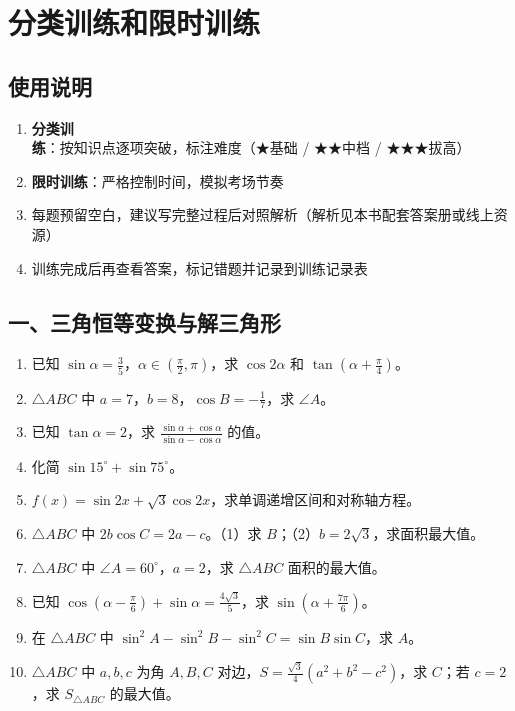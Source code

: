 \section{分类训练和限时训练}

\subsection{使用说明}

\begin{enumerate}
  \item \textbf{分类训练}：按知识点逐项突破，标注难度（★基础 / ★★中档 / ★★★拔高）
  \item \textbf{限时训练}：严格控制时间，模拟考场节奏
  \item 每题预留空白，建议写完整过程后对照解析（解析见本书配套答案册或线上资源）
  \item 训练完成后再查看答案，标记错题并记录到训练记录表
\end{enumerate}

\subsection{一、三角恒等变换与解三角形}

\begin{enumerate}
  \item[★] 已知 $\sin\alpha = \frac35$，$\alpha\in(\frac{\pi}{2},\pi)$，求 $\cos2\alpha$ 和 $\tan(\alpha+\frac{\pi}{4})$。
  \vspace{1.5cm}
  \item[★] $\triangle ABC$ 中 $a=7$，$b=8$，$\cos B=-\frac17$，求 $\angle A$。
  \vspace{1.5cm}
  \item[★] 已知 $\tan\alpha = 2$，求 $\frac{\sin\alpha+\cos\alpha}{\sin\alpha-\cos\alpha}$ 的值。
  \vspace{1.5cm}
  \item[★] 化简 $\sin15^\circ + \sin75^\circ$。
  \vspace{1cm}
  \item[★★] $f(x)=\sin2x+\sqrt3\cos2x$，求单调递增区间和对称轴方程。
  \vspace{2cm}
  \item[★★] $\triangle ABC$ 中 $2b\cos C = 2a-c$。（1）求 $B$；（2）$b=2\sqrt3$，求面积最大值。
  \vspace{3cm}
  \item[★★] $\triangle ABC$ 中 $\angle A=60^\circ$，$a=2$，求 $\triangle ABC$ 面积的最大值。
  \vspace{2.5cm}
  \item[★★] 已知 $\cos(\alpha-\frac{\pi}{6})+\sin\alpha = \frac{4\sqrt3}{5}$，求 $\sin(\alpha+\frac{7\pi}{6})$。
  \vspace{2cm}
  \item[★★] 在 $\triangle ABC$ 中 $\sin^2A-\sin^2B-\sin^2C = \sin B\sin C$，求 $A$。
  \vspace{2cm}
  \item[★★★] $\triangle ABC$ 中 $a,b,c$ 为角 $A,B,C$ 对边，$S=\frac{\sqrt3}{4}(a^2+b^2-c^2)$，求 $C$；若 $c=2$，求 $S_{\triangle ABC}$ 的最大值。
  \vspace{3cm}
\end{enumerate}

